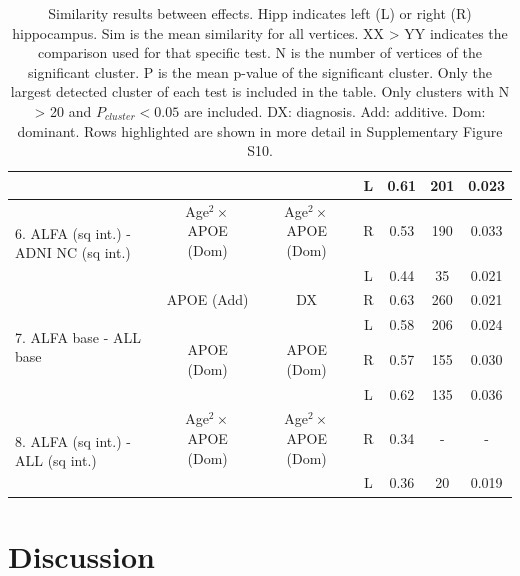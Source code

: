 \begin{table}[htbp]
{\begin{tabular}{@{}p{7cm}cccccc}
                              & \cellcolor{Gray}   & \cellcolor{Gray} &  \cellcolor{Gray} L   & \cellcolor{Gray} 0.61 & \cellcolor{Gray} 201 & \cellcolor{Gray} 0.023 \\ \midrule
\multirow{2}{*}{6. ALFA (sq int.) - ADNI NC (sq int.)} & Age$^2\times$APOE (Dom) & Age$^2\times$APOE (Dom)  & R    & 0.53 & 190 & 0.033 \\
                               &     &          & L    & 0.44 & 35 & 0.021 \\ \midrule
\multirow{4}{*}{7. ALFA base - ALL base}  &  APOE (Add)      & DX   & R   & 0.63 & 260 & 0.021 \\ 
                              &      &          & L    & 0.58 & 206 & 0.024 \\
                              &   APOE (Dom)      & APOE (Dom)   & R   & 0.57 & 155 & 0.030 \\ 
                              &       &          & L    & 0.62 & 135 & 0.036 \\ \midrule
\multirow{2}{*}{8. ALFA (sq int.) - ALL (sq int.)}     & Age$^2\times$APOE (Dom) & Age$^2\times$APOE (Dom)  & R  & 0.34 & - & - \\
                               &          &          & L    & 0.36 & 20 & 0.019 \\ \bottomrule 
\end{tabular}}
\caption[Similarity results between effects.]{\small Similarity results between effects. Hipp indicates left (L) or right (R) hippocampus. Sim is the mean similarity for all vertices. XX > YY indicates the comparison used for that specific test. N is the number of vertices of the significant cluster. P is the mean p-value of the significant cluster. Only the largest detected cluster of each test is included in the table. Only clusters with N > 20 and $P_{cluster} < 0.05$ are included. DX: diagnosis. Add: additive. Dom: dominant. Rows highlighted are shown in more detail in Supplementary Figure S10.}\label{table:sim}
\end{table}

\section{Discussion}
\label{sec:discussion}


